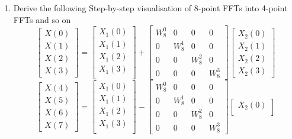\documentclass[journal,12pt,twocolumn]{IEEEtran}
\renewcommand\thesection{\arabic{section}}
\begin{document}
\begin{enumerate}[label=\thesection.\arabic*]
\begin{enumerate}[label=\arabic*.,ref=\thesection.\theenumi]
	\item Derive the following Step-by-step visualisation  of
	8-point FFTs into 4-point FFTs and so on
	\begin{equation}
		\begin{bmatrix}
			X(0) \\ 
			X(1) \\ 
			X(2) \\ 
			X(3)
		\end{bmatrix}
		=
		\begin{bmatrix}
			X_{1}(0) \\ 
			X_{1}(1)\\ 
			X_{1}(2)\\
			X_{1}(3)\\
		\end{bmatrix}
		+
		\begin{bmatrix}
			W^{0}_{8} & 0 & 0 & 0\\
			0 & W^{1}_{8} & 0 & 0\\
			0 & 0 & W^{2}_{8} & 0\\
			0 & 0 & 0 & W^{3}_{8}
		\end{bmatrix}
		\begin{bmatrix}
			X_{2}(0) \\ 
			X_{2}(1) \\ 
			X_{2}(2) \\
			X_{2}(3)
		\end{bmatrix}
	\end{equation}
	\begin{equation}
		\begin{bmatrix}
			X(4) \\ 
			X(5) \\ 
			X(6) \\ 
			X(7)
		\end{bmatrix}
		=
		\begin{bmatrix}
			X_{1}(0) \\ 
			X_{1}(1)\\ 
			X_{1}(2)\\
			X_{1}(3)\\
		\end{bmatrix}
		-
		\begin{bmatrix}
			W^{0}_{8} & 0 & 0 & 0\\
			0 & W^{1}_{8} & 0 & 0\\
			0 & 0 & W^{2}_{8} & 0\\
			0 & 0 & 0 & W^{3}_{8}
		\end{bmatrix}
		\begin{bmatrix}
			X_{2}(0) \\ 

\end{bmatrix}
\end{equation}
\end{enumerate}
\end{enumerate}
\end{document}
